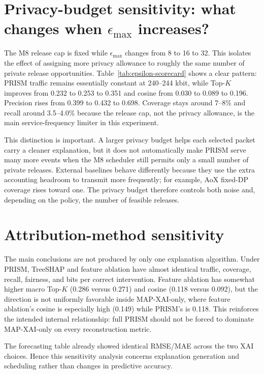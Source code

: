 \documentclass[11pt]{article}
\newcommand{\MAP}{MAP-XAI}
\begin{document}
\section{Privacy-budget sensitivity: what changes when \texorpdfstring{$\epsilon_{\max}$}{epsilon-max} increases?}
The M8 release cap is fixed while $\epsilon_{\max}$ changes from 8 to 16 to 32. This isolates the effect of assigning more privacy allowance to roughly the same number of private release opportunities. Table~\ref{tab:epsilon-scorecard} shows a clear pattern: PRISM traffic remains essentially constant at 240--244 kbit, while Top-$K$ improves from 0.232 to 0.253 to 0.351 and cosine from 0.030 to 0.089 to 0.196. Precision rises from 0.399 to 0.432 to 0.698. Coverage stays around 7--8\% and recall around 3.5--4.0\% because the release cap, not the privacy allowance, is the main service-frequency limiter in this experiment.



This distinction is important. A larger privacy budget helps each selected packet carry a cleaner explanation, but it does not automatically make PRISM serve many more events when the M8 scheduler still permits only a small number of private releases. External baselines behave differently because they use the extra accounting headroom to transmit more frequently; for example, AoX fixed-DP coverage rises toward one. The privacy budget therefore controls both noise and, depending on the policy, the number of feasible releases.


\section{Attribution-method sensitivity}
The main conclusions are not produced by only one explanation algorithm. Under PRISM, TreeSHAP and feature ablation have almost identical traffic, coverage, recall, fairness, and bits per correct intervention. Feature ablation has somewhat higher macro Top-$K$ (0.286 versus 0.271) and cosine (0.118 versus 0.092), but the direction is not uniformly favorable inside \MAP{}-only, where feature ablation's cosine is especially high (0.149) while PRISM's is 0.118. This reinforces the intended internal relationship: full PRISM should not be forced to dominate \MAP{}-only on every reconstruction metric.



The forecasting table already showed identical RMSE/MAE across the two XAI choices. Hence this sensitivity analysis concerns explanation generation and scheduling rather than changes in predictive accuracy.
\end{document}
